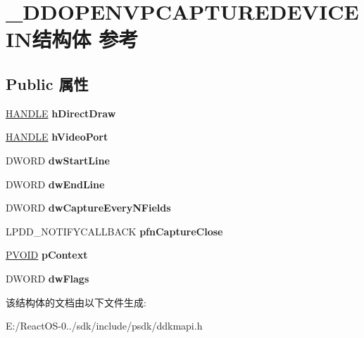 \hypertarget{struct___d_d_o_p_e_n_v_p_c_a_p_t_u_r_e_d_e_v_i_c_e_i_n}{}\section{\+\_\+\+D\+D\+O\+P\+E\+N\+V\+P\+C\+A\+P\+T\+U\+R\+E\+D\+E\+V\+I\+C\+E\+I\+N结构体 参考}
\label{struct___d_d_o_p_e_n_v_p_c_a_p_t_u_r_e_d_e_v_i_c_e_i_n}
\subsection*{Public 属性}
\begin{DoxyCompactItemize}
\item 
\mbox{\label{struct___d_d_o_p_e_n_v_p_c_a_p_t_u_r_e_d_e_v_i_c_e_i_n_acc0eac865149a31b269bc25df0f82f48}} 
\hyperlink{interfacevoid}{H\+A\+N\+D\+LE} {\bfseries h\+Direct\+Draw}
\item 
\mbox{\label{struct___d_d_o_p_e_n_v_p_c_a_p_t_u_r_e_d_e_v_i_c_e_i_n_a58fcca7ab4c806c81acaa05de49ef5a4}} 
\hyperlink{interfacevoid}{H\+A\+N\+D\+LE} {\bfseries h\+Video\+Port}
\item 
\mbox{\label{struct___d_d_o_p_e_n_v_p_c_a_p_t_u_r_e_d_e_v_i_c_e_i_n_a3b20a48ce10611fdc71fcaed2db70dd4}} 
D\+W\+O\+RD {\bfseries dw\+Start\+Line}
\item 
\mbox{\label{struct___d_d_o_p_e_n_v_p_c_a_p_t_u_r_e_d_e_v_i_c_e_i_n_aa4e93d71f8708e27bebf35deabc97423}} 
D\+W\+O\+RD {\bfseries dw\+End\+Line}
\item 
\mbox{\label{struct___d_d_o_p_e_n_v_p_c_a_p_t_u_r_e_d_e_v_i_c_e_i_n_a74cd76ce62e50a7f14dc0b40ebd8162a}} 
D\+W\+O\+RD {\bfseries dw\+Capture\+Every\+N\+Fields}
\item 
\mbox{\label{struct___d_d_o_p_e_n_v_p_c_a_p_t_u_r_e_d_e_v_i_c_e_i_n_a1aa2f217aff387bd2b5e37a07bfdfdb7}} 
L\+P\+D\+D\+\_\+\+N\+O\+T\+I\+F\+Y\+C\+A\+L\+L\+B\+A\+CK {\bfseries pfn\+Capture\+Close}
\item 
\mbox{\label{struct___d_d_o_p_e_n_v_p_c_a_p_t_u_r_e_d_e_v_i_c_e_i_n_a6f41833dbf946953d971cae730cf8d01}} 
\hyperlink{interfacevoid}{P\+V\+O\+ID} {\bfseries p\+Context}
\item 
\mbox{\label{struct___d_d_o_p_e_n_v_p_c_a_p_t_u_r_e_d_e_v_i_c_e_i_n_aed66bd4539c476081ca7583b82cbc792}} 
D\+W\+O\+RD {\bfseries dw\+Flags}
\end{DoxyCompactItemize}


该结构体的文档由以下文件生成\+:\begin{DoxyCompactItemize}
\item 
E\+:/\+React\+O\+S-\/0../sdk/include/psdk/ddkmapi.\+h\end{DoxyCompactItemize}
